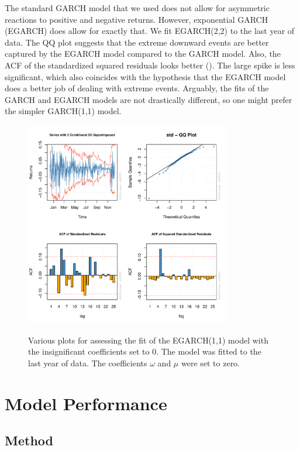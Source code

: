 \documentclass[12pt]{article}
\begin{document}
The standard GARCH model that we used does not allow for asymmetric reactions to positive and negative returns. However, exponential GARCH (EGARCH) does allow for exactly that. We fit EGARCH(2,2) to the last year of data. The QQ plot suggests that the extreme downward events are better captured by the EGARCH model compared to the GARCH model. Also, the ACF of the standardized squared residuals looks better (). The large spike is less significant, which also coincides with the hypothesis that the EGARCH model does a better job of dealing with extreme events. Arguably, the fits of the GARCH and EGARCH models are not drastically different, so one might prefer the simpler GARCH(1,1) model.

\begin{figure}[h]
    \centering
    \caption{Various plots for assessing the fit of the EGARCH(1,1) model with the insignificant coefficients set to 0. The model was fitted to the last year of data. The coefficients $\omega$ and $\mu$ were set to zero.}
    \includegraphics[width=0.8\textwidth]{egarch_one_year_fit.pdf}
    \label{fig:egarch_one_year_fit}
\end{figure}

\clearpage

\section{Model Performance}

\subsection{Method}
\end{document}
